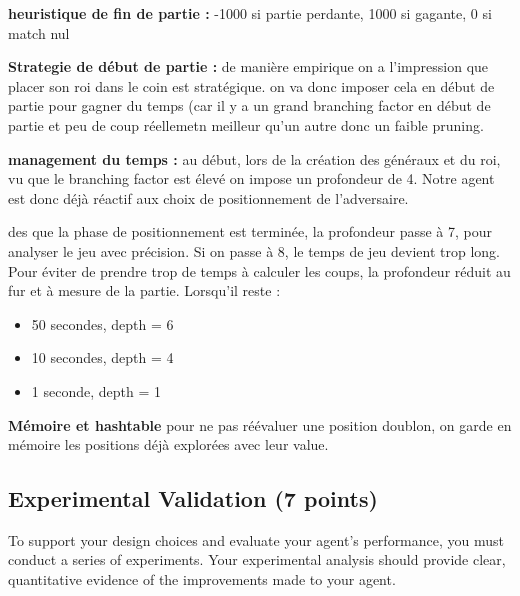 \documentclass[11pt,a4paper]{report}
\begin{document}
\begin{answers}[10cm]
\textbf{heuristique de fin de partie :}
-1000 si partie perdante, 1000 si gagante, 0 si match nul

\textbf{Strategie de début de partie : }
de manière empirique on a l'impression que placer son roi dans le coin est stratégique. on va donc imposer cela en début de partie pour gagner du temps (car il y a un grand branching factor en début de partie et peu de coup réellemetn meilleur qu'un autre donc un faible pruning.

\textbf{management du temps :}
au début, lors de la création des généraux et du roi, vu que le branching factor est élevé on impose un profondeur de 4. Notre agent est donc déjà réactif aux choix de positionnement de l'adversaire. 

des que la phase de positionnement est terminée, la profondeur passe à 7, pour analyser le jeu avec précision. Si on passe à 8, le temps de jeu devient trop long. 
Pour éviter de prendre trop de temps à calculer les coups, la profondeur réduit au fur et à mesure de la partie. Lorsqu'il reste : 
\begin{itemize}
    \item 50 secondes, depth = 6
    \item 10 secondes, depth = 4
    \item 1 seconde, depth = 1
\end{itemize}

\textbf{Mémoire et hashtable}
pour ne pas réévaluer une position doublon, on garde en mémoire les positions déjà explorées avec leur value.

\end{answers}

\begin{answers}[23cm]
\end{answers}

\newpage
\subsection{Experimental Validation (7 points)}

To support your design choices and evaluate your agent's performance, you must conduct a series of experiments. Your experimental analysis should provide clear, quantitative evidence of the improvements made to your agent.
\end{document}
